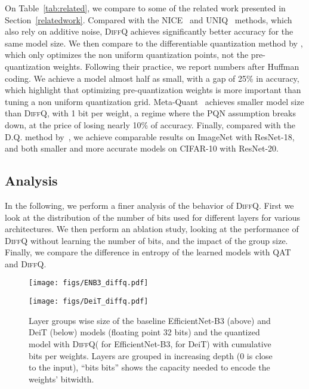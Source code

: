 \documentclass{article}
\newcommand{\diffq}{\textsc{DiffQ}\xspace}
\begin{document}
On Table~\ref{tab:related}, we compare to some of the related work presented in Section~\ref{relatedwork}. Compared
with the NICE~\citep{baskin2018nice} and UNIQ~\citep{baskin2018uniq} methods, which also rely on additive noise, \diffq
achieves significantly better accuracy for the same model size.
We then compare to the differentiable quantization method by \citep{polino2018model}, which only optimizes the non uniform quantization points, not the pre-quantization weights. Following their practice, we report
numbers after Huffman coding. We achieve a model almost half as small, with a gap of 25\% in accuracy, which highlight that optimizing pre-quantization weights is more important than tuning a non uniform quantization grid.
Meta-Quant~\citep{chen2019metaquant} achieves smaller model size than \diffq, with 1 bit per weight, a regime where the PQN assumption breaks down, at the price of losing nearly 10\% of accuracy. 
Finally, compared with the D.Q. method by~\citet{uhlich2020mixed},
we achieve comparable results on ImageNet with ResNet-18, and both smaller and more accurate models on CIFAR-10 with ResNet-20.
 
\vspace{-0.2cm}
\subsection{Analysis}
\label{analysis}

In the following, we perform a finer analysis of the behavior of \diffq.
First we look at the distribution of the number of bits used for different layers for various architectures.
We then perform an ablation study, looking at the performance of \diffq without learning the number of bits, and the impact of the group size. Finally, we compare the difference in entropy of the learned models with QAT and \diffq.

\begin{figure}[t!]
\vskip 0.2in
\begin{center}
\centerline{\texttt{[image: figs/ENB3\_diffq.pdf]}}
\centerline{\texttt{[image: figs/DeiT\_diffq.pdf]}}
\caption{Layer groups wise size of the baseline EfficientNet-B3 (above) and DeiT (below) models (floating point 32 bits) and the quantized model with \diffq ( for EfficientNet-B3,  for DeiT) with cumulative bits per weights. Layers are grouped in increasing depth (0 is close to the input), ``bits bits'' shows the capacity needed to encode the weights' bitwidth.}
\label{fig:hist}
\end{center}
\vskip -0.3in
\end{figure}
\end{document}
